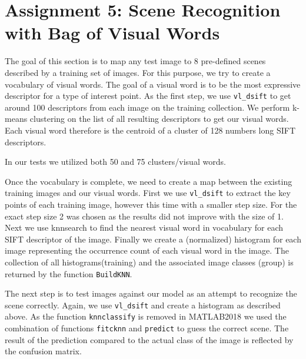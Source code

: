 \section{Assignment 5: Scene Recognition with Bag of Visual Words}

The goal of this section is to map any test image to 8 pre-defined scenes described by a training set of images. For this purpose, we try to create a vocabulary of visual words. The goal of a visual word is to be the most expressive descriptor for a type of interest point. As the first step, we use \texttt{vl\_dsift} to get around 100 descriptors from each image on the training collection. We perform k-means clustering on the list of all resulting descriptors to get our visual words. Each visual word therefore is the centroid of a cluster of 128 numbers long SIFT descriptors.


In our tests we utilized both 50 and 75 clusters/visual words.


Once the vocabulary is complete, we need to create a map between the existing training images and our visual words. First we use \texttt{vl\_dsift} to extract the key points of each training image, however this time with a smaller step size. For the exact step size 2 was chosen as the results did not improve with the size of 1. Next we use knnsearch to find the nearest visual word in vocabulary for each SIFT descriptor of the image. Finally we create a (normalized) histogram for each image representing the occurrence count of each visual word in the image. The collection of all histograms(training) and the associated image classes (group) is returned by the function \texttt{BuildKNN}.


The next step is to test images against our model as an attempt to recognize the scene correctly. Again, we use \texttt{vl\_dsift} and create a histogram as described above. As the function \texttt{knnclassify} is removed in MATLAB2018 we used the combination of functions \texttt{fitcknn} and \texttt{predict} to guess the correct scene. The result of the prediction compared to the actual class of the image is reflected by the confusion matrix.

